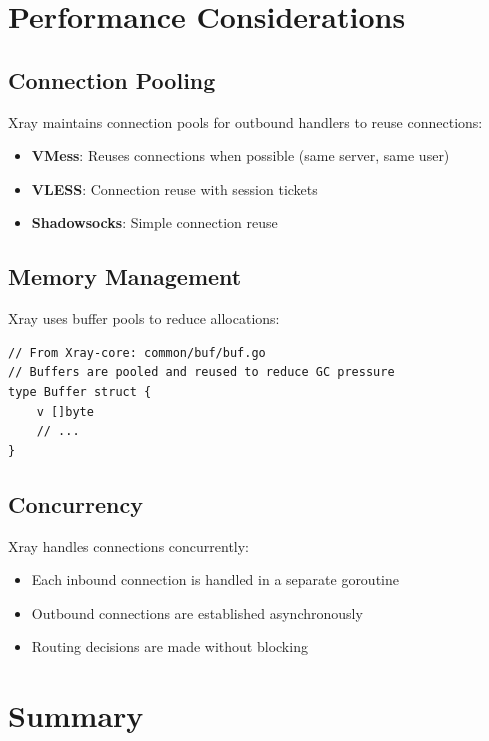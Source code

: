 \section{Performance Considerations}

\subsection{Connection Pooling}

Xray maintains connection pools for outbound handlers to reuse connections:

\begin{itemize}
    \item \textbf{VMess}: Reuses connections when possible (same server, same user)
    \item \textbf{VLESS}: Connection reuse with session tickets
    \item \textbf{Shadowsocks}: Simple connection reuse
\end{itemize}

\subsection{Memory Management}

Xray uses buffer pools to reduce allocations:

\begin{verbatim}
// From Xray-core: common/buf/buf.go
// Buffers are pooled and reused to reduce GC pressure
type Buffer struct {
    v []byte
    // ...
}
\end{verbatim}

\subsection{Concurrency}

Xray handles connections concurrently:
\begin{itemize}
    \item Each inbound connection is handled in a separate goroutine
    \item Outbound connections are established asynchronously
    \item Routing decisions are made without blocking
\end{itemize}

\section{Summary}

